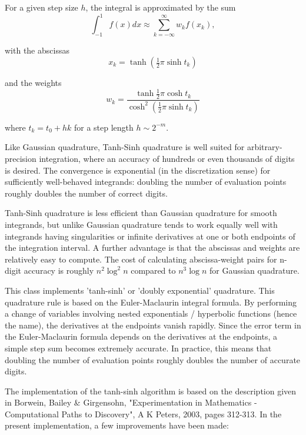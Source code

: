 For a given step size $h$, the integral is approximated by the sum
\begin{equation}
\int_{-1}^1 f(x) dx \approx \sum_{k=-\infty}^\infty w_k f(x_k),
\end{equation}

with the abscissas
\begin{equation}
x_k = \tanh \left(\tfrac{1}{2} \pi \sinh t_k \right)
\end{equation}

and the weights
\begin{equation}
w_k = \frac{\tanh \tfrac{1}{2} \pi \cosh t_k}{\cosh^2 (\tfrac{1}{2} \pi \sinh t_k)}
\end{equation}

where $t_k=t_0+hk$ for a step length $h \sim 2^{-m}$.

Like Gaussian quadrature, Tanh-Sinh quadrature is well suited for arbitrary-precision integration, where an accuracy of hundreds or even thousands of digits is desired. The convergence is exponential (in the discretization sense) for sufficiently well-behaved integrands: doubling the number of evaluation points roughly doubles the number of correct digits.

Tanh-Sinh quadrature is less efficient than Gaussian quadrature for smooth integrands, but unlike Gaussian quadrature tends to work equally well with integrands having singularities or infinite derivatives at one or both endpoints of the integration interval. A further advantage is that the abscissas and weights are relatively easy to compute. The cost of calculating abscissa-weight pairs for n-digit accuracy is roughly $n^2 \log^2 n$ compared to $n^3 \log n$ for Gaussian quadrature.



\vpara
This class implements 'tanh-sinh' or 'doubly exponential' quadrature. This quadrature rule is based on the Euler-Maclaurin integral formula. By performing a change of variables involving nested exponentials / hyperbolic functions (hence the name), the derivatives at the endpoints vanish rapidly. Since the error term in the Euler-Maclaurin formula depends on the derivatives at the endpoints, a simple step sum becomes
extremely accurate. In practice, this means that doubling the number of evaluation points roughly doubles the number of accurate digits.


\vpara
The implementation of the tanh-sinh algorithm is based on the description given in Borwein, Bailey \& Girgensohn, "Experimentation in Mathematics - Computational Paths to Discovery", A K Peters, 2003, pages 312-313. In the present implementation, a few improvements have been made:

